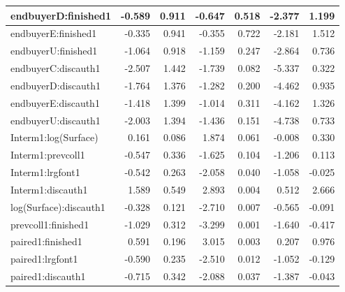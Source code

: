 \documentclass[]{article}
\begin{document}
\begin{table}[!h]
\begin{tabular}[t]{l|r|r|r|r|r|r}
\hline
endbuyerD:finished1 & -0.589 & 0.911 & -0.647 & 0.518 & -2.377 & 1.199\\
\hline
endbuyerE:finished1 & -0.335 & 0.941 & -0.355 & 0.722 & -2.181 & 1.512\\
\hline
endbuyerU:finished1 & -1.064 & 0.918 & -1.159 & 0.247 & -2.864 & 0.736\\
\hline
endbuyerC:discauth1 & -2.507 & 1.442 & -1.739 & 0.082 & -5.337 & 0.322\\
\hline
endbuyerD:discauth1 & -1.764 & 1.376 & -1.282 & 0.200 & -4.462 & 0.935\\
\hline
endbuyerE:discauth1 & -1.418 & 1.399 & -1.014 & 0.311 & -4.162 & 1.326\\
\hline
endbuyerU:discauth1 & -2.003 & 1.394 & -1.436 & 0.151 & -4.738 & 0.733\\
\hline
Interm1:log(Surface) & 0.161 & 0.086 & 1.874 & 0.061 & -0.008 & 0.330\\
\hline
Interm1:prevcoll1 & -0.547 & 0.336 & -1.625 & 0.104 & -1.206 & 0.113\\
\hline
Interm1:lrgfont1 & -0.542 & 0.263 & -2.058 & 0.040 & -1.058 & -0.025\\
\hline
Interm1:discauth1 & 1.589 & 0.549 & 2.893 & 0.004 & 0.512 & 2.666\\
\hline
log(Surface):discauth1 & -0.328 & 0.121 & -2.710 & 0.007 & -0.565 & -0.091\\
\hline
prevcoll1:finished1 & -1.029 & 0.312 & -3.299 & 0.001 & -1.640 & -0.417\\
\hline
paired1:finished1 & 0.591 & 0.196 & 3.015 & 0.003 & 0.207 & 0.976\\
\hline
paired1:lrgfont1 & -0.590 & 0.235 & -2.510 & 0.012 & -1.052 & -0.129\\
\hline
paired1:discauth1 & -0.715 & 0.342 & -2.088 & 0.037 & -1.387 & -0.043\\
\hline
\end{tabular}
\end{table}
\end{document}
